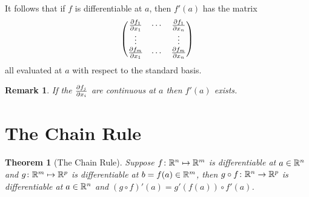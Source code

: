 \documentclass{notes}
\theoremstyle{plain}
\newtheorem{theorem}[proposition]{Theorem}
\newtheorem*{remark}{Remark}
\begin{document}
It follows that if $ f $ is differentiable at $ a $, then $ f'(a) 
$ has the matrix
\[ \begin{pmatrix}\frac{\partial f_{1}}{\partial x_{1}}& \cdots & \frac{\partial f_{1}}{\partial x_{n}} \\
             \vdots & & \vdots \\
             \frac{\partial f_{m}}{\partial x_{1}} & \cdots & \frac{\partial f_{m}}{\partial x_{n}} 
             \end{pmatrix}\]
all evaluated at $ a $ with respect to the standard basis.
\begin{remark} If the $ \frac{\partial f_{j}}{\partial x_{i}} $ are continuous at $ a $ then $ 
f'(a) $ exists.
\end{remark}

\section{The Chain Rule}

\begin{theorem}[The Chain Rule]
Suppose $ f\colon \mathbb{R}^{n} \mapsto \mathbb{R}^{m} $ is differentiable at $ a 
\in \mathbb{R}^{n} $ and $ g\colon \mathbb{R}^{m}\mapsto \mathbb{R}^{p} $ is differentiable 
at $ b=f(a) \in \mathbb{R}^{m} $, then $ g \circ f \colon  \mathbb{R}^{n} \to 
\mathbb{R}^{p} $ is differentiable at $ a \in \mathbb{R}^{n} $ and $ (g \circ 
f)'(a) = g'(f(a)) \circ f'(a) $.
\end{theorem}
\end{document}
